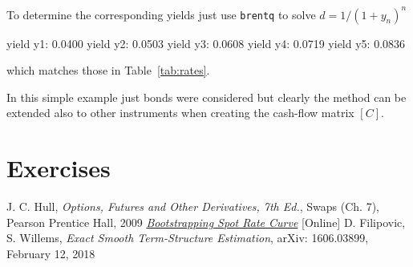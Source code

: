 
\begin{ioutput}
[0.96153846 0.90659341 0.83765291 0.75756548 0.66938146]	
\end{ioutput}
To determine the corresponding yields just use \texttt{brentq} to solve $d=1/(1+y_n)^{n}$

\begin{ioutput}
yield y1: 0.0400
yield y2: 0.0503
yield y3: 0.0608
yield y4: 0.0719
yield y5: 0.0836
\end{ioutput}
which matches those in Table~\ref{tab:rates}.

In this simple example just bonds were considered but clearly the method can be extended also to other instruments when creating the cash-flow matrix $[C]$.

\section*{Exercises}


\begin{thebibliography}{9}
 J. C. Hull, \emph{Options, Futures and Other Derivatives, 7th Ed.}, Swaps (Ch. 7), Pearson Prentice Hall, 2009
 \href{https://financetrain.com/bootstrapping-spot-rate-curve-zero-curve}{\emph{Bootstrapping Spot Rate Curve}} [Online]
 D. Filipovic, S. Willems, \emph{Exact Smooth Term-Structure Estimation}, arXiv: 1606.03899, February 12, 2018
\end{thebibliography}
